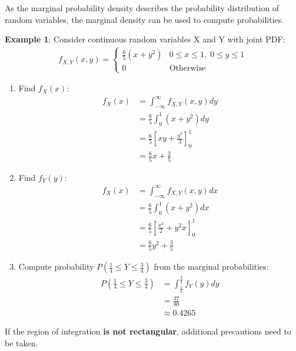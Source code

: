 \documentclass[10pt,a4paper]{article}
\begin{document}
As the marginal probability density describes the probability distribution of random variables, the
marginal density can be used to compute probabilities.

\textbf{Example 1}: Consider continuous random variables X and Y with joint PDF:
\begin{align*}
    f_{X,Y} (x,y) = 
    \begin{cases}
        \frac{6}{5}(x+y^2) & 0\leq x \leq 1, \; 0\leq y \leq 1 \\
        0 & \text{Otherwise}
    \end{cases}
\end{align*}
\begin{enumerate}
    \item Find $f_X(x)$:
    \begin{align*}
        f_X(x) &= \int_{-\infty}^\infty f_{X,Y}(x,y)dy \\
        &= \frac{6}{5}\int_0^1 (x+y^2) dy \\
        &= \frac{6}{5}\left[xy + \frac{y^3}{3}\right]_0^1 \\
        &= \frac{6}{5}x + \frac{2}{5}
    \end{align*}
    \item Find $f_Y(y)$:
    \begin{align*}
        f_X(x) &= \int_{-\infty}^\infty f_{X,Y}(x,y)dx \\
        &= \frac{6}{5}\int_0^1 (x+y^2) dx \\
        &= \frac{6}{5}\left[\frac{x^2}{2}+y^2x\right]_0^1 \\
        &= \frac{6}{5}y^2 + \frac{3}{5}
    \end{align*}
    \item Compute probability $P\left(\frac{1}{4}\leq Y \leq \frac{3}{4}\right)$ from the marginal probabilities:
    \begin{align*}
        P\left(\frac{1}{4}\leq Y \leq \frac{3}{4}\right) &= \int_{\frac{1}{4}}^{\frac{3}{4}} f_Y(y) dy \\
        &= \frac{37}{80} \\
        &\approx 0.4265
    \end{align*}
\end{enumerate}

If the region of integration \textbf{is not rectangular}, additional precautions need to be taken.
\end{document}
